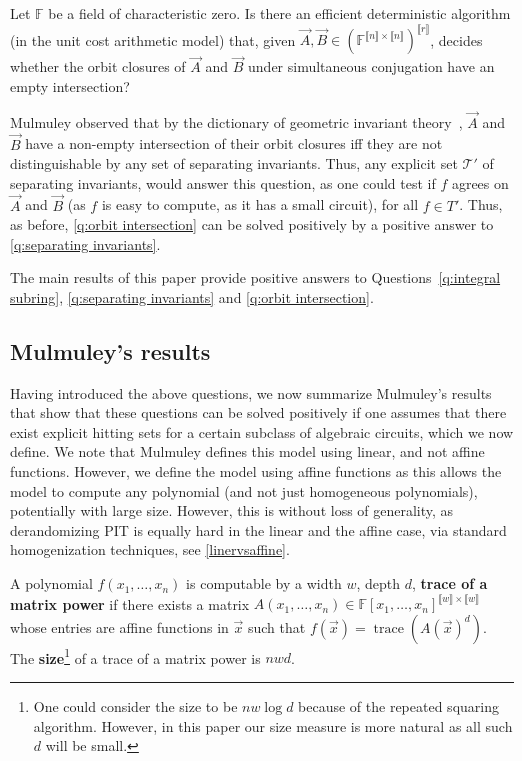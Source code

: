 \documentclass[letterpaper,11pt]{article}
\numberwithin{equation}{section}
\theoremstyle{plain}
\theoremstyle{remark}
\newcommand{\zr}[1]{{\llbracket {#1}\rrbracket}}
\DeclareMathOperator{\Tr}{trace}
\newcommand{\F}{\mathbb{F}}
\newcommand{\cT}{\mathcal{T}}
\begin{document}
\begin{question}
	\label{q:orbit intersection}
	Let $\F$ be a field of characteristic zero.  Is there an efficient deterministic algorithm (in the unit cost arithmetic model) that, given $\vec{A},\vec{B}\in(\F^{\zr{n}\times \zr{n}})^{\zr{r}}$, decides whether the orbit closures of $\vec{A}$ and $\vec{B}$ under simultaneous conjugation have an empty intersection?
\end{question}

Mulmuley observed that by the dictionary of geometric invariant theory~\cite{MFK}, $\vec{A}$ and $\vec{B}$ have a non-empty intersection of their orbit closures iff they are not distinguishable by any set of separating invariants.  Thus, any explicit set $\cT'$ of separating invariants, would answer this question, as one could test if $f$ agrees on $\vec{A}$ and $\vec{B}$ (as $f$ is easy to compute, as it has a small circuit), for all $f\in T'$. Thus, as before, \autoref{q:orbit intersection} can be solved positively by a positive answer to \autoref{q:separating invariants}.

The main results of this paper provide positive answers to Questions~\ref{q:integral subring}, \ref{q:separating invariants} and \ref{q:orbit intersection}.

\subsection{Mulmuley's results}

Having introduced the above questions, we now summarize Mulmuley's results that show that these questions can be solved positively if one assumes that there exist explicit hitting sets for a certain subclass of algebraic circuits, which we now define.  We note that Mulmuley defines this model using linear, and not affine functions.  However, we define the model using affine functions as this allows the model to compute any polynomial (and not just homogeneous polynomials), potentially with large size.  However, this is without loss of generality, as derandomizing PIT is equally hard in the linear and the affine case, via standard homogenization techniques, see \autoref{linervsaffine}.

\begin{definition}[Mulmuley]\label{def: ST}
	A polynomial $f(x_1,\ldots,x_n)$ is computable by a width $w$, depth $d$, \textbf{trace of a matrix power} if there exists a matrix $A(x_1,\ldots,x_n)\in\F[x_1,\ldots,x_n]^{\zr{w}\times\zr{w}}$ whose entries are affine functions in $\vec{x}$  such that $f(\vec{x})=\Tr(A(\vec{x})^d)$. The \textbf{size}\footnote{One could consider the size to be $nw\log d$ because of the repeated squaring algorithm. However, in this paper our size measure is more natural as all such $d$ will be small.} of a trace of a matrix power is $nwd$.
\end{definition}
\end{document}

